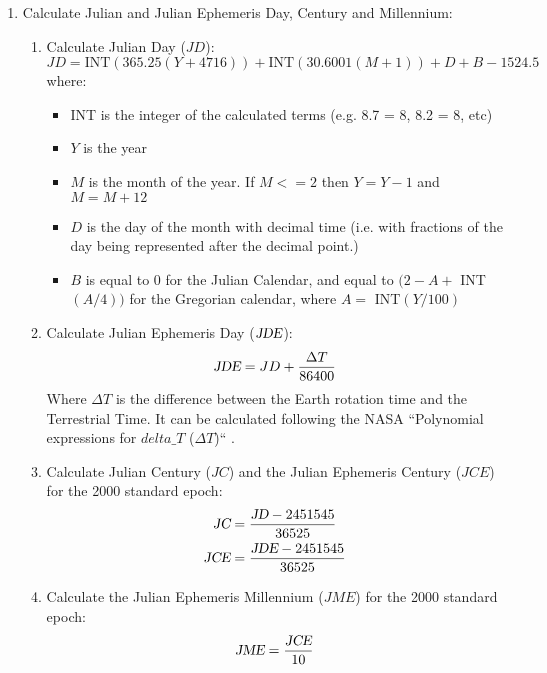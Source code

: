 { %
\begin{enumerate}
\item Calculate Julian and Julian Ephemeris Day, Century and Millennium:
\begin{enumerate}
  \item Calculate Julian Day ($JD$):
  \begin{displaymath}
  JD = \text{INT}(365.25 (Y + 4716)) + \text{INT}(30.6001 (M + 1)) + D + B -1524.5
  \end{displaymath}
  where:
  \begin{itemize}
    \item INT is the integer of the calculated terms (e.g. 8.7 = 8, 8.2 = 8, etc)
    \item $Y$ is the year
    \item $M$ is the month of the year. If $M <= 2$ then $Y = Y - 1$ and $M = M + 12$
    \item $D$ is the day of the month with decimal time (i.e. with fractions of the day 
    being represented after the decimal point.)
    \item $B$ is equal to 0 for the Julian Calendar, and equal to $(2 - A + $ INT$(A/4))$ for the
    Gregorian calendar, where $A = $ INT$(Y/100)$
  \end{itemize}
  \item Calculate Julian Ephemeris Day ($\text{\sl JDE}$):
  \begin{displaymath}
  \text{\sl JDE} = JD + \frac{\Delta T}{86400}
  \end{displaymath}
  Where $\Delta T$ is the difference between the Earth rotation time and the Terrestrial Time.
  It can be calculated following the NASA ``Polynomial expressions for $delta\_T$ ($\Delta T$)`` \cite{REDA1}.

  \item Calculate Julian Century ($JC$) and the Julian Ephemeris Century ($JCE$) for the 2000 standard epoch:
  \begin{gather*}
  \text{\sl JC} = \frac{\text{\sl JD} - 2451545}{36525} \\
  \text{\sl JCE} = \frac{\text{\sl JDE} - 2451545}{36525}
  \end{gather*}

  \item Calculate the Julian Ephemeris Millennium ($JME$) for the 2000 standard epoch:
  \begin{displaymath}
  \text{\sl JME} = \frac{\text{\sl JCE}}{10}
  \end{displaymath}


\end{enumerate}
\end{enumerate}}
